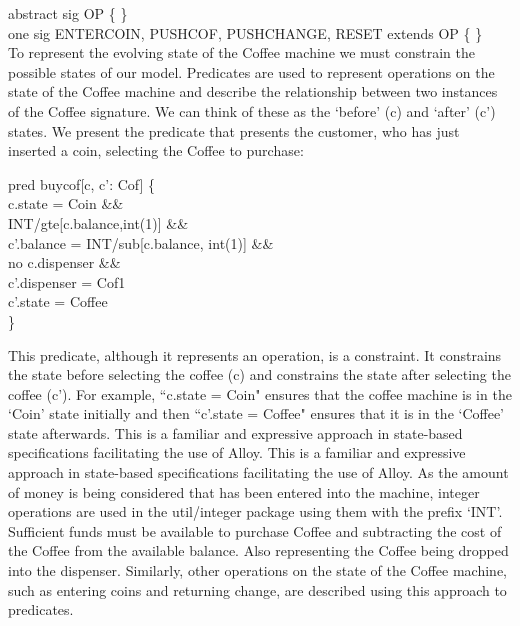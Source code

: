 \documentclass[a4paper,12pt]{extarticle}
\begin{document}
abstract sig OP \{ \}\\
one sig ENTERCOIN, PUSHCOF, PUSHCHANGE, RESET extends OP \{ \}\\

To represent the evolving state of the Coffee machine we must constrain the possible states of our model. Predicates are used to represent operations on the state of the Coffee machine and describe the relationship between two instances of the Coffee signature. We can think of these as the `before' (c) and `after' (c') states. We present the predicate that presents the customer, who has just inserted a coin, selecting the Coffee to purchase:\\
\begin{algorithm}

pred buycof[c, c': Cof] \{ \\
 
c.state = Coin \&\& \\
INT/gte[c.balance,int(1)] \&\& \\
c'.balance = INT/sub[c.balance, int(1)] \&\& \\
no c.dispenser \&\& \\
c'.dispenser = Cof1\\
c'.state = Coffee\\

\}\\
\end{algorithm}


This predicate, although it represents an operation, is a constraint. It constrains the state before selecting the coffee (c) and constrains the state after selecting the coffee (c'). For example, ``c.state = Coin" ensures that the coffee machine is in the `Coin’ state initially and then ``c'.state = Coffee" ensures that it is in the `Coffee' state afterwards. This is a familiar and expressive approach in state-based specifications facilitating the use of Alloy. This is a familiar and expressive approach in state-based specifications facilitating the use of Alloy. As the amount of money is being considered that has been entered into the machine, integer operations are used in the util/integer package using them with the prefix `INT’. Sufficient funds must be available to purchase Coffee and subtracting the cost of the Coffee from the available balance. Also representing the Coffee being dropped into the dispenser. Similarly, other operations on the state of the Coffee machine, such as entering coins and returning change, are described using this approach to predicates.\\
\end{document}
